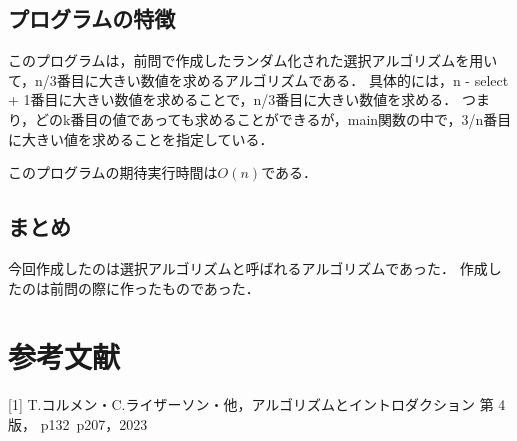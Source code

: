 \documentclass{ltjsarticle}
\begin{document}
\subsection{プログラムの特徴}
このプログラムは，前問で作成したランダム化された選択アルゴリズムを用いて，n/3番目に大きい数値を求めるアルゴリズムである．
具体的には，n - select + 1番目に大きい数値を求めることで，n/3番目に大きい数値を求める．
つまり，どのk番目の値であっても求めることができるが，main関数の中で，3/n番目に大きい値を求めることを指定している．

このプログラムの期待実行時間は$O(n)$である．

\subsection{まとめ}
今回作成したのは選択アルゴリズムと呼ばれるアルゴリズムであった．
作成したのは前問の際に作ったものであった．

\section{参考文献}
[1] T.コルメン・C.ライザーソン・他，アルゴリズムとイントロダクション 第 4 版，
p132~p207，2023
\end{document}
